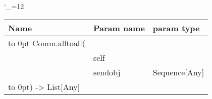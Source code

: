 \begingroup \catcode`\_=12 \tt
\begin{tabular}{lll}
\toprule
\textrm{Name}&\textrm{Param name}&\textrm{param type}\\
\midrule
\hbox to 0pt {Comm.alltoall(\hss}\\
& self\\
& sendobj & Sequence[Any]\\
\hbox to 0pt{) -> List[Any]\hss}\\
\bottomrule
\end{tabular}
\endgroup
